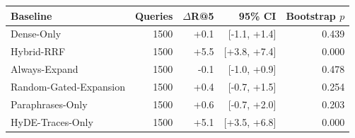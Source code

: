 \begin{tabular}{lrrrr}
\toprule
Baseline & Queries & $\Delta$R@5 & 95\% CI & Bootstrap $p$ \\
\midrule
Dense-Only & 1500 & +0.1 & [-1.1, +1.4] & 0.439 \\
Hybrid-RRF & 1500 & +5.5 & [+3.8, +7.4] & 0.000 \\
Always-Expand & 1500 & -0.1 & [-1.0, +0.9] & 0.478 \\
Random-Gated-Expansion & 1500 & +0.4 & [-0.7, +1.5] & 0.254 \\
Paraphrases-Only & 1500 & +0.6 & [-0.7, +2.0] & 0.203 \\
HyDE-Traces-Only & 1500 & +5.1 & [+3.5, +6.8] & 0.000 \\
\bottomrule
\end{tabular}
